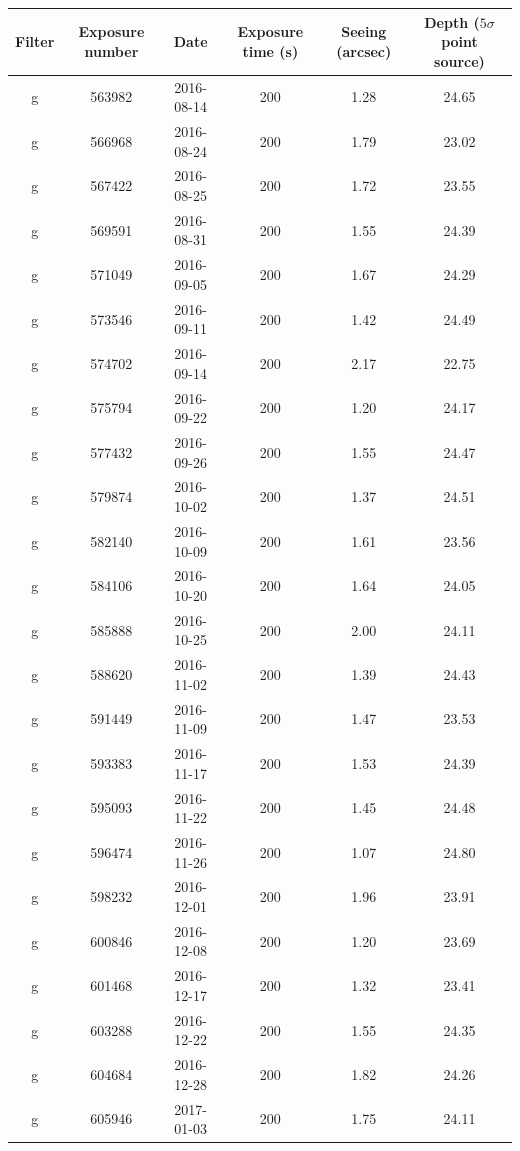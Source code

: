 \documentclass[11pt,letterpaper,linenumbers]{aastex63}
\begin{document}
\begin{table}
  \begin{center}
    \begin{scriptsize}
    \begin{tabular}{cccccc}
      \hline
      Filter & Exposure number & Date & Exposure time (s) &
      Seeing (arcsec) & Depth ($5 \sigma$ point source) \\
      \hline
      g & 563982 & 2016-08-14 & 200 & 1.28 & 24.65 \\
      g & 566968 & 2016-08-24 & 200 & 1.79 & 23.02 \\
      g & 567422 & 2016-08-25 & 200 & 1.72 & 23.55 \\
      g & 569591 & 2016-08-31 & 200 & 1.55 & 24.39 \\
      g & 571049 & 2016-09-05 & 200 & 1.67 & 24.29 \\
      g & 573546 & 2016-09-11 & 200 & 1.42 & 24.49 \\
      g & 574702 & 2016-09-14 & 200 & 2.17 & 22.75 \\
      g & 575794 & 2016-09-22 & 200 & 1.20 & 24.17 \\
      g & 577432 & 2016-09-26 & 200 & 1.55 & 24.47 \\
      g & 579874 & 2016-10-02 & 200 & 1.37 & 24.51 \\
      g & 582140 & 2016-10-09 & 200 & 1.61 & 23.56 \\
      g & 584106 & 2016-10-20 & 200 & 1.64 & 24.05 \\
      g & 585888 & 2016-10-25 & 200 & 2.00 & 24.11 \\
      g & 588620 & 2016-11-02 & 200 & 1.39 & 24.43 \\
      g & 591449 & 2016-11-09 & 200 & 1.47 & 23.53 \\
      g & 593383 & 2016-11-17 & 200 & 1.53 & 24.39 \\
      g & 595093 & 2016-11-22 & 200 & 1.45 & 24.48 \\
      g & 596474 & 2016-11-26 & 200 & 1.07 & 24.80 \\
      g & 598232 & 2016-12-01 & 200 & 1.96 & 23.91 \\
      g & 600846 & 2016-12-08 & 200 & 1.20 & 23.69 \\
      g & 601468 & 2016-12-17 & 200 & 1.32 & 23.41 \\
      g & 603288 & 2016-12-22 & 200 & 1.55 & 24.35 \\
      g & 604684 & 2016-12-28 & 200 & 1.82 & 24.26 \\
      g & 605946 & 2017-01-03 & 200 & 1.75 & 24.11 \\

\end{tabular}
\end{scriptsize}
\end{center}
\end{table}
\end{document}
